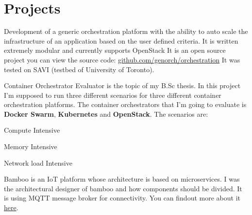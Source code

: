 \documentclass[]{deedy-resume-openfont}
\begin{document}
\begin{minipage}[t]{0.66\textwidth}
\sectionsep

\section{Projects}
    Development of a generic orchestration platform with the ability to
    auto scale the infrastructure of an application based on the user defined
    criteria. It is written extremely modular and currently supports OpenStack
    It is an open source project you can view the source code: \href{https://github.com/genorch/orchestration}{github.com/genorch/orchestration}
    It was tested on SAVI (testbed of University of Toronto).
\sectionsep

    Container Orchestrator Evaluator is the topic of my B.Sc thesis. In this
    project I'm supposed to run three different scenarios for three different
    container orchestration platforms. The container orchestrators that I'm
    going to evaluate is \textbf{Docker Swarm}, \textbf{Kubernetes} and \textbf{OpenStack}.
    The scenarios are:
    \vspace{\topsep} %
    \begin{tightemize}
    \item
        Compute Intensive
    \item
        Memory Intensive
    \item
        Network load Intensive

    \end{tightemize}

\sectionsep

    Bamboo is an IoT platform whose architecture is based on microservices.
    I was the architectural designer of bamboo and how components should be
    divided. It is using MQTT message broker for connectivity.
    You can findout more about it \href{https://github.com/bambil/bamboo}{here}.
\sectionsep



% 
% 

\end{minipage}
\end{document}
